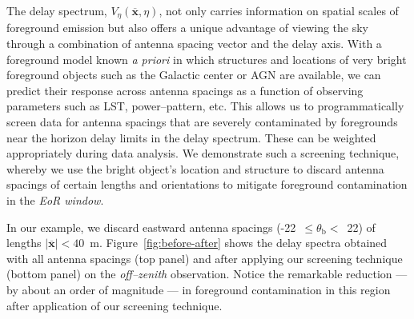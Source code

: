 \documentclass[preprint2,iop,numberedappendix]{emulateapj}
\begin{document}
The delay spectrum, $V_\eta(\overline{\mathbf{x}},\eta)$, not only carries information on spatial scales of foreground emission but also offers a unique advantage of viewing the sky through a combination of antenna spacing vector and the delay axis. With a foreground model known {\it a priori} in which structures and locations of very bright foreground objects such as the Galactic center or AGN are available, we can predict their response across antenna spacings as a function of observing parameters such as LST, power--pattern, etc. This allows us to programmatically screen data for antenna spacings that are severely contaminated by foregrounds near the horizon delay limits in the delay spectrum. These can be weighted appropriately during data analysis. We demonstrate such a screening technique, whereby we use the bright object's location and structure to discard antenna spacings of certain lengths and orientations to mitigate foreground contamination in the {\it EoR window}. 

In our example, we discard eastward antenna spacings (-22~$\le\theta_\textrm{b}<$~22) of lengths $|\overline{\mathbf{x}}| < 40$~m. Figure~\ref{fig:before-after} shows the delay spectra obtained with all antenna spacings (top panel) and after applying our screening technique (bottom panel) on the {\it off--zenith} observation. Notice the remarkable reduction --- by about an order of magnitude --- in foreground contamination in this region after application of our screening technique. 
\end{document}
